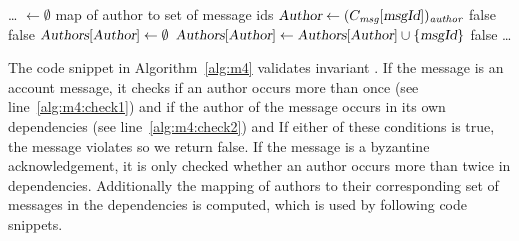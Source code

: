 \begin{algorithm}[ht]
\caption{Code snippet verifying }
    \label{alg:m4}
\begin{algorithmic}[1]
    \Statex \ldots \vphantom{I}
    \State {} $\gets \emptyset$ \Comment map of author to set of message ids
     \Comment {}
        \State $\textsl{Author} \gets (C_\emph{msg}[\textsl{msgId}])_\emph{author}$
             \label{alg:m4:check1}
                \State \Return false
            \EndIf
             \label{alg:m4:check2}
                \State \Return false
            \EndIf
        \EndIf
            \State $\textsl{Authors}[\textsl{Author}] \gets \emptyset$
        \EndIf
        \State $\textsl{Authors}[\textsl{Author}] \gets \textsl{Authors}[\textsl{Author}] \cup \{\textsl{msgId}\}$
            \State \Return false
        \EndIf
    \EndFor
    \Statex \ldots \vphantom{I}
\end{algorithmic}
\end{algorithm}
The code snippet in Algorithm~\ref{alg:m4} validates invariant . If the message is an account message, it checks if an author occurs more than once (see line~\ref{alg:m4:check1}) and if the author of the message occurs in its own dependencies (see line~\ref{alg:m4:check2}) and If either of these conditions is true, the message violates  so we return false.
If the message is a byzantine acknowledgement, it is only checked whether an author occurs more than twice in dependencies.
Additionally the mapping  of authors to their corresponding set of messages in the dependencies is computed, which is used by following code snippets.

